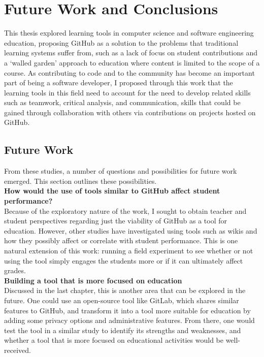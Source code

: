 \chapter{Future Work and Conclusions}

This thesis explored learning tools in computer science and software engineering education, proposing GitHub as a solution to the problems that traditional learning systems suffer from, such as a lack of focus on student contributions and a `walled garden' approach to education where content is limited to the scope of a course. As contributing to code and to the community has become an important part of being a software developer, I proposed through this work that the learning tools in this field need to account for the need to develop related skills such as teamwork, critical analysis, and communication, skills that could be gained through collaboration with others via contributions on projects hosted on GitHub.

\section{Future Work}
From these studies, a number of questions and possibilities for future work emerged. This section outlines these possibilities. \\

\textbf{How would the use of tools similar to GitHub affect student performance?} \\
Because of the exploratory nature of the work, I sought to obtain teacher and student perspectives regarding just the viability of GitHub as a tool for education. However, other studies have investigated using tools such as wikis \cite{minocha2007collaborative} and how they possibly affect or correlate with student performance. This is one natural extension of this work: running a field experiment to see whether or not using the tool simply engages the students more or if it can ultimately affect grades. \\

\textbf{Building a tool that is more focused on education} \\
Discussed in the last chapter, this is another area that can be explored in the future. One could use an open-source tool like GitLab, which shares similar features to GitHub, and transform it into a tool more suitable for education by adding some privacy options and administrative features. From there, one would test the tool in a similar study to identify its strengths and weaknesses, and whether a tool that is more focused on educational activities would be well-received. \\

